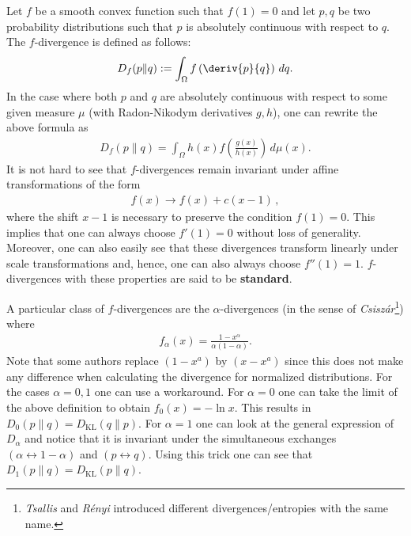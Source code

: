     \begin{example}
        Let $f$ be a smooth convex function such that $f(1)=0$ and let $p,q$ be two probability distributions such that $p$ is absolutely continuous with respect to $q$. The $f$-divergence is defined as follows:
        \begin{gather}
            D_f(p\|q) := \int_\Omega f\left(\deriv{p}{q}\right)\,dq.
        \end{gather}
        In the case where both $p$ and $q$ are absolutely continuous with respect to some given measure $\mu$ (with Radon-Nikodym derivatives $g,h$), one can rewrite the above formula as
        \begin{gather}
            D_f(p\|q) = \int_\Omega h(x)f\left(\frac{g(x)}{h(x)}\right)\,d\mu(x).
        \end{gather}
        It is not hard to see that $f$-divergences remain invariant under affine transformations of the form
        \begin{gather}
            f(x)\longrightarrow f(x) + c(x-1)\,,
        \end{gather}
        where the shift $x-1$ is necessary to preserve the condition $f(1)=0$. This implies that one can always choose $f'(1)=0$ without loss of generality. Moreover, one can also easily see that these divergences transform linearly under scale transformations and, hence, one can also always choose $f''(1)=1$. $f$-divergences with these properties are said to be \textbf{standard}.

        A particular class of $f$-divergences are the $\alpha$-divergences (in the sense of \textit{Csisz\'ar}\footnote{\textit{Tsallis} and \textit{R\'enyi} introduced different divergences/entropies with the same name.}) where
        \begin{gather}
            f_\alpha(x) = \frac{1-x^\alpha}{\alpha(1-\alpha)}.
        \end{gather}
        Note that some authors replace $(1-x^a)$ by $(x-x^a)$ since this does not make any difference when calculating the divergence for normalized distributions. For the cases $\alpha=0,1$ one can use a workaround. For $\alpha=0$ one can take the limit of the above definition to obtain $f_0(x) = -\ln x$. This results in $D_0(p\|q) = D_\mathrm{KL}(q\|p)$. For $\alpha=1$ one can look at the general expression of $D_\alpha$ and notice that it is invariant under the simultaneous exchanges $(\alpha\leftrightarrow1-\alpha)$ and $(p\leftrightarrow q)$. Using this trick one can see that $D_1(p\|q) = D_\mathrm{KL}(p\|q)$.
    \end{example}

